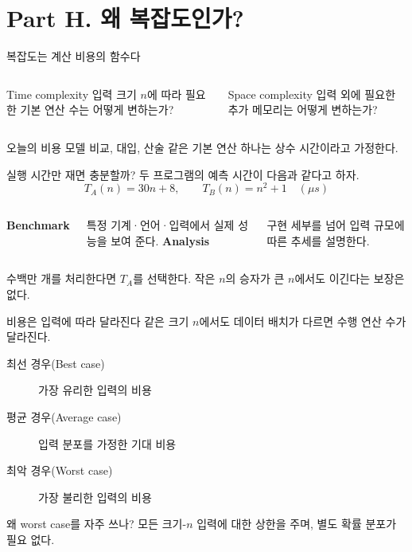 \section{Part H. 왜 복잡도인가?}

\begin{frame}{복잡도는 계산 비용의 함수다}
  \begin{columns}[T,onlytextwidth]
      \begin{block}{Time complexity}
        입력 크기 $n$에 따라 필요한 기본 연산 수는 어떻게 변하는가?
      \end{block}
      \begin{block}{Space complexity}
        입력 외에 필요한 추가 메모리는 어떻게 변하는가?
      \end{block}
  \end{columns}
  \vfill
  \begin{alertblock}{오늘의 비용 모델}
    비교, 대입, 산술 같은 기본 연산 하나는 상수 시간이라고 가정한다.
  \end{alertblock}
\end{frame}

\begin{frame}{실행 시간만 재면 충분할까?}
  두 프로그램의 예측 시간이 다음과 같다고 하자.
  \[
    T_A(n)=30n+8,\qquad T_B(n)=n^2+1 \quad (\mu s)
  \]
  \begin{columns}[T,onlytextwidth]
      \textbf{Benchmark}\par
      특정 기계·언어·입력에서 실제 성능을 보여 준다.
      \textbf{Analysis}\par
      구현 세부를 넘어 입력 규모에 따른 추세를 설명한다.
  \end{columns}
  \vfill
  수백만 개를 처리한다면 $T_A$를 선택한다. 작은 $n$의 승자가 큰 $n$에서도 이긴다는 보장은 없다.
\end{frame}

\begin{frame}{비용은 입력에 따라 달라진다}
  같은 크기 $n$에서도 데이터 배치가 다르면 수행 연산 수가 달라진다.
  \begin{description}
    \item[최선 경우(Best case)] 가장 유리한 입력의 비용
    \item[평균 경우(Average case)] 입력 분포를 가정한 기대 비용
    \item[최악 경우(Worst case)] 가장 불리한 입력의 비용
  \end{description}
  \begin{block}{왜 worst case를 자주 쓰나?}
    모든 크기-$n$ 입력에 대한 상한을 주며, 별도 확률 분포가 필요 없다.
  \end{block}
\end{frame}

